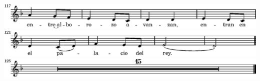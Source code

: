 \else
  \expandafter{}%
\fi
\includegraphics{b0/lily-2159aa8d-23}%
\ifx\betweenLilyPondSystem \undefined
  \linebreak
\else
  \expandafter{}%
\fi
\includegraphics{b0/lily-2159aa8d-24}%
\ifx\betweenLilyPondSystem \undefined
  \linebreak
\else
  \expandafter{}%
\fi
\includegraphics{b0/lily-2159aa8d-25}%
